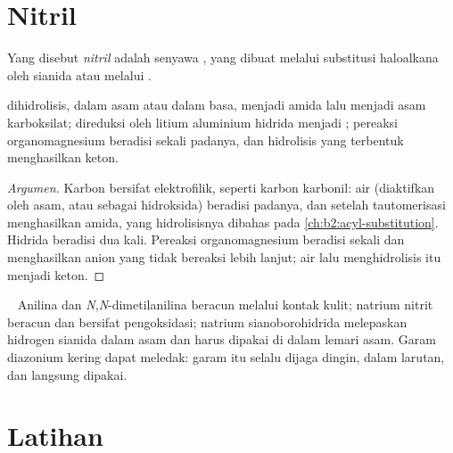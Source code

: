 \section{Nitril}

\begin{definition}[Nitril]\label{def:b2:amines:nitrile}
Yang disebut \emph{nitril} adalah senyawa , yang
dibuat melalui substitusi haloalkana oleh sianida atau melalui .
\end{definition}

\begin{proposition}\label{prop:b2:amines:nitrile}
 dihidrolisis, dalam asam atau dalam basa, menjadi amida lalu menjadi
asam karboksilat;  direduksi oleh litium aluminium hidrida menjadi
 ; pereaksi organomagnesium beradisi sekali padanya,
dan hidrolisis  yang terbentuk menghasilkan keton.
\end{proposition}

\begin{proof}[Argumen]
Karbon  bersifat elektrofilik, seperti karbon karbonil: air
(diaktifkan oleh asam, atau sebagai hidroksida) beradisi padanya, dan
setelah tautomerisasi menghasilkan amida, yang hidrolisisnya dibahas pada
\cref{ch:b2:acyl-substitution}. Hidrida beradisi dua kali. Pereaksi
organomagnesium beradisi sekali dan menghasilkan anion  yang tidak
bereaksi lebih lanjut; air lalu menghidrolisis  itu menjadi keton.
\end{proof}

\begin{safety}{\,\,\,}
Anilina dan \textit{N},\textit{N}-dimetilanilina beracun melalui kontak
kulit; natrium nitrit beracun dan bersifat pengoksidasi; natrium
sianoborohidrida melepaskan hidrogen sianida dalam asam dan harus dipakai di
dalam lemari asam. Garam diazonium kering dapat meledak: garam itu selalu
dijaga dingin, dalam larutan, dan langsung dipakai.
\end{safety}

\section{Latihan}

